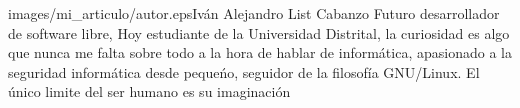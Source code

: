 \begin{multicols}{2}



\begin{biografia}{images/mi_articulo/autor.eps}{Iván Alejandro List Cabanzo} %
Futuro desarrollador de software libre, Hoy estudiante de la Universidad Distrital, la curiosidad es algo que nunca me falta sobre todo a la hora de hablar de informática, apasionado a la seguridad informática desde pequeńo, seguidor de la filosofía GNU/Linux. El único limite del ser humano es su imaginación
\end{biografia}

\end{multicols} %


\clearpage
\pagebreak
